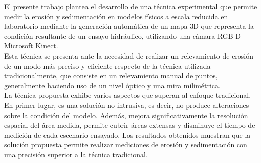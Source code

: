\begin{resumen}

El presente trabajo plantea el desarrollo de una técnica experimental que permite medir la erosión y sedimentación en modelos físicos a escala reducida en laboratorio mediante la generación automática de un mapa 3D que representa la condición resultante de un ensayo hidráulico, utilizando una cámara RGB-D Microsoft Kinect. \\
Esta técnica se presenta ante la necesidad de realizar un relevamiento de erosión de un modo más preciso y eficiente respecto de la técnica utilizada tradicionalmente, que consiste en un relevamiento manual de puntos, generalmente haciendo uso de un nivel óptico y una mira milimétrica.\\ 
La técnica propuesta exhibe varios aspectos que superan al enfoque tradicional. En primer lugar, es una solución no intrusiva, es decir, no produce alteraciones sobre la condición del modelo. Además, mejora significativamente la resolución espacial del área medida, permite cubrir áreas extensas y disminuye el tiempo de medición de cada escenario ensayado. Los resultados obtenidos muestran que la solución propuesta permite realizar mediciones de erosión y sedimentación con una precisión superior a la técnica tradicional. \\

\end{resumen}
